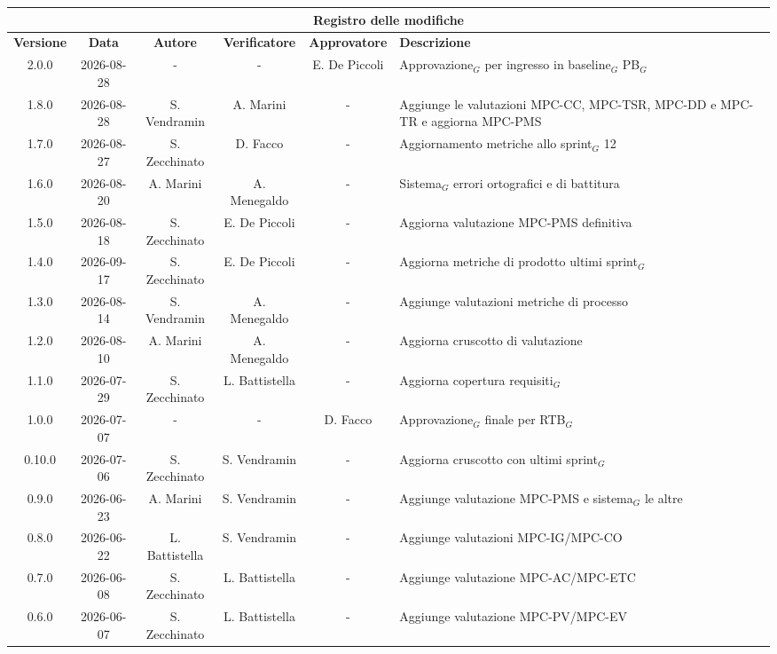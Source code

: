 \documentclass[a4paper, 10pt, colorlinks=true, linkcolor=black, urlcolor=blue, citecolor=blue, hidelinks]{article}
\begin{document}
\begin{longtable}{|c|c|c|c|c|p{3.5cm}|}
    \hline
    \multicolumn{6}{|c|}{\textbf{Registro delle modifiche}} \\
    \hline
    \textbf{Versione} & \textbf{Data} & \textbf{Autore} & \textbf{Verificatore} & \textbf{Approvatore} & \textbf{Descrizione} \\
    \hline
    \endhead
    2.0.0 & 2026-08-28 & - & - & E. De Piccoli & Approvazione$_G$ per ingresso in baseline$_G$ PB$_G$ \\
    \hline
    1.8.0 & 2026-08-28 & S. Vendramin & A. Marini & - & Aggiunge le valutazioni MPC-CC, MPC-TSR, MPC-DD e MPC-TR e aggiorna MPC-PMS \\
    \hline
    1.7.0 & 2026-08-27 & S. Zecchinato & D. Facco & - & Aggiornamento metriche allo sprint$_G$ 12 \\
    \hline
    1.6.0 & 2026-08-20 & A. Marini & A. Menegaldo & - & Sistema$_G$ errori ortografici e di battitura \\
    \hline
    1.5.0 & 2026-08-18 & S. Zecchinato & E. De Piccoli & - & Aggiorna valutazione MPC-PMS definitiva \\
    \hline
    1.4.0 & 2026-09-17 & S. Zecchinato & E. De Piccoli & - & Aggiorna metriche di prodotto ultimi sprint$_G$ \\
    \hline
    1.3.0 & 2026-08-14 & S. Vendramin & A. Menegaldo & - & Aggiunge valutazioni metriche di processo \\
    \hline
    1.2.0 & 2026-08-10 & A. Marini & A. Menegaldo & - & Aggiorna cruscotto di valutazione \\
    \hline
    1.1.0 & 2026-07-29 & S. Zecchinato & L. Battistella & - & Aggiorna copertura requisiti$_G$ \\
    \hline
    1.0.0 & 2026-07-07 & - & - & D. Facco & Approvazione$_G$ finale per RTB$_G$ \\
    \hline
    0.10.0 & 2026-07-06 & S. Zecchinato & S. Vendramin & - & Aggiorna cruscotto con ultimi sprint$_G$ \\
    \hline
    0.9.0 & 2026-06-23 & A. Marini & S. Vendramin & - & Aggiunge valutazione MPC-PMS e sistema$_G$ le altre \\
    \hline
    0.8.0 & 2026-06-22 & L. Battistella & S. Vendramin & - & Aggiunge valutazioni MPC-IG/MPC-CO \\
    \hline
    0.7.0 & 2026-06-08 & S. Zecchinato & L. Battistella & - & Aggiunge valutazione MPC-AC/MPC-ETC \\ 
    \hline
    0.6.0 & 2026-06-07 & S. Zecchinato & L. Battistella & - & Aggiunge valutazione MPC-PV/MPC-EV \\

\end{longtable}
\end{document}
